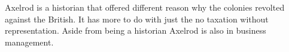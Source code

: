Axelrod is a historian that offered different reason why the colonies revolted
against the British. It has more to do with just the no taxation without
representation. Aside from being a historian Axelrod is also in business
management. 
